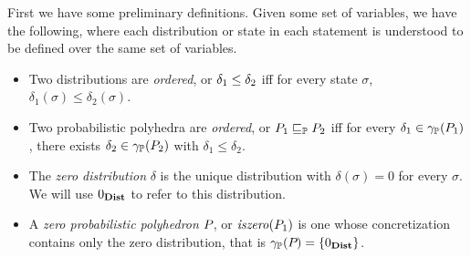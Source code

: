 \begin{definition} First we have some preliminary definitions. Given
some set of variables, we have the following, where each distribution
or state in each statement is understood
to be defined over the same set of variables.
\begin{itemize} 
\item{} Two distributions are \emph{ordered}, or
$ \delta_1 \leq \delta_2 $ iff for every state $ \sigma $,
$ \delta_1(\sigma) \leq \delta_2(\sigma) $.
\item{} Two probabilistic polyhedra are \emph{ordered}, or
$ P_{1} \sqsubseteq_{\mathbb{P}} P_{2} $ iff for every $ \delta_1 \in \gamma_{\mathbb{P}}(P_{1})
$, there exists $ \delta_2 \in \gamma_{\mathbb{P}}(P_{2}) $ with
$ \delta_1 \leq \delta_2 $.
\item{} The \emph{zero distribution} $ \delta $ is the unique
distribution with $ \delta(\sigma) = 0 $ for every $ \sigma $. We will
use $ 0_{\textbf{Dist}} $ to refer to this distribution.
\item{} A \emph{zero probabilistic polyhedron} $ P_{} $, or
$ \mathit{iszero}(P_{1}) $ is one whose
concretization contains only the zero distribution, that is
$ \gamma_{\mathbb{P}}(P_{}) = \left\{ 0_{\textbf{Dist}} \right\} $.
\end{itemize}
\end{definition}

